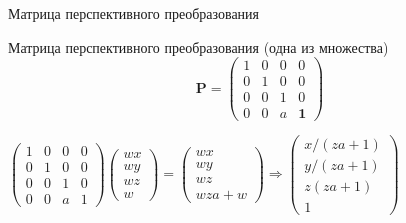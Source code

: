 \documentclass[10pt]{beamer}
\begin{document}
  	\begin{frame}{Матрица перспективного преобразования}
  	\begin{block}{Матрица перспективного преобразования (одна из множества)}
  		$$\mathbf P=\begin{pmatrix}
  			1&0&0&0\\
  			0&1&0&0\\
  			0&0&1&0\\
  			0&0&a&\mathbf{1}
  		\end{pmatrix}$$
  	\end{block}
  	
  	$
  	\begin{pmatrix}
  		1&0&0&0\\
  		0&1&0&0\\
  		0&0&1&0\\
  		0&0&a&1
  	\end{pmatrix}
  	\begin{pmatrix}
  		wx\\
  		wy\\
  		wz\\
  		w
  	\end{pmatrix}
  	=
  	\begin{pmatrix}
  		wx\\
  		wy\\
  		wz\\
  		wza+w
  	\end{pmatrix}
  	\Rightarrow
  	\begin{pmatrix}
  		x / (za+1) \\
  		y / (za+1) \\
  		z  (za + 1) \\
  		1
  	\end{pmatrix}
  	$
  	
  \end{frame}
  
\end{document}
